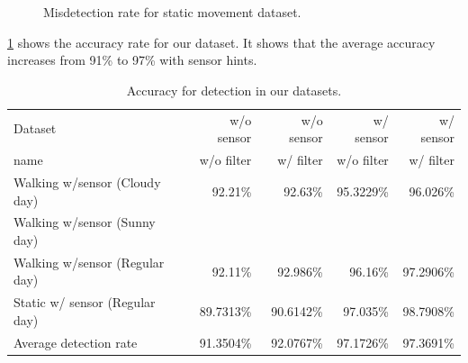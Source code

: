 \begin{figure}[!ht]
\centering
{}

\caption{Misdetection rate for static movement dataset.}
\label{f:fp_stat}
\end{figure}

\ref{t:acc_stat} shows the accuracy rate for our  dataset.
It shows that the average accuracy increases from 91\% to 97\% with sensor hints.

\begin{table}[h!]
  \centering
  \caption{Accuracy for detection in our datasets.}
  \label{t:acc_stat}
  \begin{tabular}{  l  r  r r r }
    \rowcolor{gray!50}
    Dataset & w/o sensor & w/o sensor & w/ sensor & w/ sensor \\
    \rowcolor{gray!50}
    name & w/o filter & w/ filter & w/o filter & w/ filter \\
    \hline
    Walking w/sensor (Cloudy day) & 92.21\% & 92.63\% & 95.3229\% & 96.026\% \\
    Walking w/sensor (Sunny day) & & & \\
    Walking w/sensor (Regular day) & 92.11\% & 92.986\% & 96.16\% & 97.2906\% \\
    Static w/ sensor (Regular day) & 89.7313\% & 90.6142\% & 97.035\% & 98.7908\% \\
    \hline
    Average detection rate & 91.3504\% & 92.0767\% & 97.1726\% & 97.3691\%\\
  \end{tabular}
\end{table}


